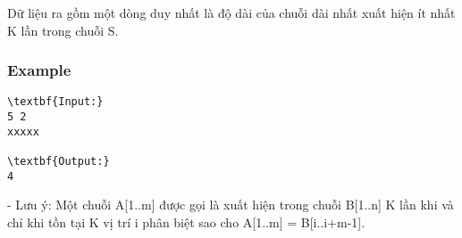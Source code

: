    Dữ liệu ra gồm một dòng duy nhất là độ dài của chuỗi dài nhất xuất hiện ít nhất K lần trong chuỗi S.  

\subsubsection{   Example  }
\begin{verbatim}
\textbf{Input:}
5 2
xxxxx

\textbf{Output:}
4
\end{verbatim}

- Lưu ý: Một chuỗi A[1..m] được gọi là xuất hiện trong chuỗi B[1..n] K lần khi và chỉ khi tồn tại K vị trí i phân biệt sao cho A[1..m] = B[i..i+m-1].
